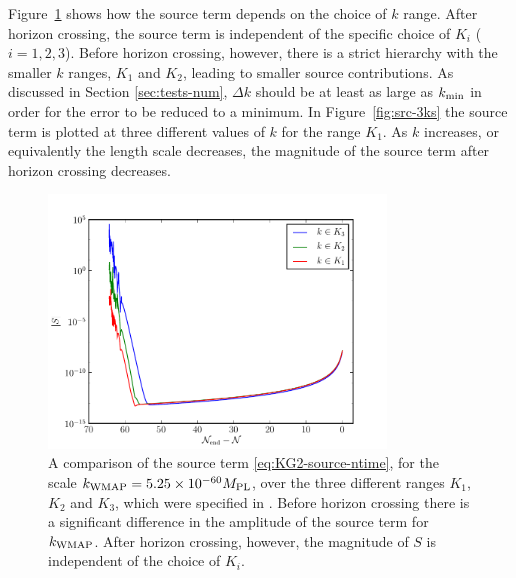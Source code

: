 % 
Figure~\ref{fig:src-kwmap-3ranges} shows how the source term depends on
the choice of $k$ range.  After horizon crossing, the source term
is independent of the specific choice of $K_i$ ($i=1,2,3$). Before horizon crossing,
however, there is a
strict hierarchy with the smaller $k$ ranges, $K_1$ and $K_2$, leading to
smaller source
contributions.  As discussed in Section \ref{sec:tests-num}, $\Delta k$
should be at least as large as $k_{\mathrm{min}}$ in order for the error to be reduced to
a minimum. In Figure~\ref{fig:src-3ks} the source term is plotted at three different
values of $k$ for the range $K_1$. As $k$ increases, or equivalently the length scale
decreases, the magnitude of the source term after horizon crossing decreases. 
% 
\begin{figure}[htbp]
\centering
 \includegraphics[width=0.8\textwidth]{numerical/graphs/src-kwmap-3ranges-large}
\caption[Comparison of source term for different ranges]{A comparison of the source
term \eqref{eq:KG2-source-ntime}, for the scale $k_\mathrm{WMAP}=5.25\times 10^{-60}M_{\mathrm{PL}}$, over the
three different ranges $K_1$,
$K_2$ and $K_3$, which were specified in . Before horizon
crossing there is a significant difference in the amplitude of the source term for
$k_\mathrm{WMAP}$. After horizon crossing, however, the magnitude of $S$ is independent of
the choice of $K_i$.
} 
\label{fig:src-kwmap-3ranges}
\end{figure}
% 
